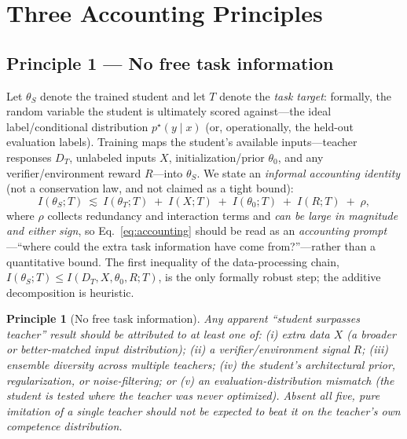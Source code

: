 \documentclass[11pt]{article}
\newtheorem{principle}{Principle}
\begin{document}
\section{Three Accounting Principles}
\label{sec:principles}

\subsection{Principle 1 --- No free task information}
Let $\theta_S$ denote the trained student and let $T$ denote the \emph{task target}: formally, the random variable the student is ultimately scored against---the ideal label/conditional distribution $p^\star(y\mid x)$ (or, operationally, the held-out evaluation labels). Training maps the student's available inputs---teacher responses $D_T$, unlabeled inputs $X$, initialization/prior $\theta_0$, and any verifier/environment reward $R$---into $\theta_S$. We state an \emph{informal accounting identity} (not a conservation law, and not claimed as a tight bound):
\begin{equation}
I(\theta_S; T)\ \lesssim\ I(\theta_T;T)\;+\;I(X;T)\;+\;I(\theta_0;T)\;+\;I(R;T)\;+\;\rho,
\label{eq:accounting}
\end{equation}
where $\rho$ collects redundancy and interaction terms and \emph{can be large in magnitude and either sign}, so Eq.~\eqref{eq:accounting} should be read as an \emph{accounting prompt}---``where could the extra task information have come from?''---rather than a quantitative bound. The first inequality of the data-processing chain, $I(\theta_S;T)\le I(D_T,X,\theta_0,R;T)$, is the only formally robust step; the additive decomposition is heuristic.

\begin{principle}[No free task information]\label{pr:nofree}
Any apparent ``student surpasses teacher'' result should be attributed to at least one of: \emph{(i)} extra data $X$ (a broader or better-matched input distribution); \emph{(ii)} a verifier/environment signal $R$; \emph{(iii)} ensemble diversity across multiple teachers; \emph{(iv)} the student's architectural prior, regularization, or noise-filtering; or \emph{(v)} an evaluation-distribution mismatch (the student is tested where the teacher was never optimized). Absent all five, pure imitation of a single teacher should not be expected to beat it on the teacher's own competence distribution.
\end{principle}
\end{document}
